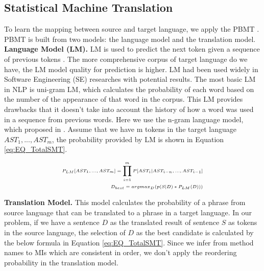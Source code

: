 \subsection{Statistical Machine Translation}
To learn the mapping between source and target language, we apply the PBMT \cite{Green2014}. PBMT is built from two models: the language model and the translation model.
\\
\textbf{Language Model (LM).}  LM is used to predict the next token given a sequence of previous tokens \cite{Koehn:2003:SPT:1073445.1073462}. The more comprehensive corpus of target language do we have, the LM model quality for prediction is higher. LM had been used widely in Software Engineering (SE) researches \cite{Hindle:2012:NS:2337223.2337322,Hel:7180076,Liu:7883371} with potential results. The most basic LM in NLP is uni-gram LM, which calculates the probability of each word based on the number of the appearance of that word in the corpus. This LM provides drawbacks that it doesn't take into account the history of how a word was used in a sequence from previous words.  Here we use the n-gram language model, which proposed in \cite{Jurafsky:2009:SLP:1214993}. Assume that we have m tokens in the target language \({AST_{1},...,AST_{m}}\), the probability provided by LM is shown in Equation \ref{eq:EQ_TotalSMT}.

\begin{equation} 
\tiny
\label{eq:EQ_TotalSMT}
\begin{split}
    P_{LM}[AST_{1}, ...,AST_{m}]=\prod_{i=1}^{m}P[AST_{i} | AST_{i-n},...,AST_{i-1}] \\
    D_{best}=argmax_{D}(p(S|D)*P_{LM}(D)))   
  \end{split}
\end{equation}

\textbf{Translation Model.} This model calculates the probability of a phrase from source language that can be translated to a phrase in a target language. In our problem, if we have a sentence   \({D}\) as the translated result of sentence \({S}\) as tokens in the source language, the selection of \({D}\) as the best candidate is calculated by the below formula in Equation \ref{eq:EQ_TotalSMT}. Since we infer from method names to MIs which are consistent in order, we don't apply the reordering probability in the translation model.



